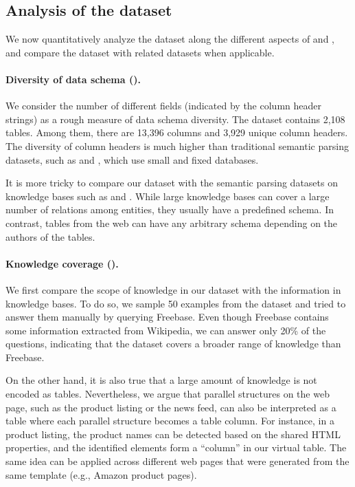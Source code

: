 \subsection{Analysis of the \wtq dataset}

We now quantitatively analyze the \wtq dataset
along the different aspects of \Breadth and \Depth,
and compare the dataset with related datasets
when applicable.

\paragraph{Diversity of data schema (\Breadth).}

We consider the number of different fields
(indicated by the column header strings)
as a rough measure of data schema diversity.
The \wtq dataset contains 2,108 tables.
Among them, there are 13,396 columns
and 3,929 unique column headers.
The diversity of column headers
is much higher than traditional semantic parsing datasets,
such as  \cite{zelle96geoquery}
and  \cite{dahl1994expanding},
which use small and fixed databases.

It is more tricky to compare our dataset
with the semantic parsing datasets on knowledge bases
such as  \cite{cai2013large}
and  \cite{berant2013freebase}.
While large knowledge bases
can cover a large number of relations
among entities,
they usually have a predefined schema.
In contrast, tables from the web can have
any arbitrary schema depending on the authors
of the tables.

\paragraph{Knowledge coverage (\Breadth).}

We first compare the scope of knowledge
in our dataset with the information in knowledge bases.
To do so, we sample 50 examples from the \wtq dataset
and tried to answer them manually by
querying Freebase.
Even though Freebase contains some information
extracted from Wikipedia,
we can answer only 20\% of the questions,
indicating that the dataset covers
a broader range of knowledge than Freebase.

On the other hand,
it is also true that a large amount of knowledge
is not encoded as tables.
Nevertheless, we argue that parallel structures on the web page,
such as the product listing or the news feed,
can also be interpreted as a table
where each parallel structure becomes a table column.
For instance, in a product listing,
the product names can be detected based on the shared HTML properties,
and the identified elements form a ``column'' in our virtual table.
The same idea can be applied across different web pages
that were generated from the same template
(e.g., Amazon product pages).

